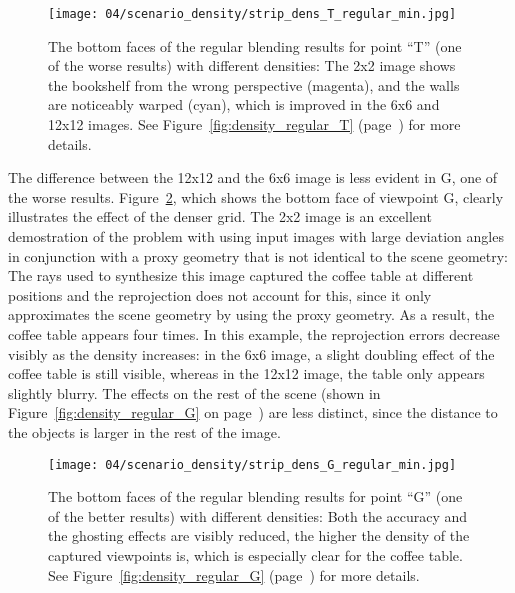 \begin{figure}[p]
		\centering
    \texttt{[image: 04/scenario\_density/strip\_dens\_T\_regular\_min.jpg]}
    \caption[Bottom faces of regular blending results for viewpoint ``T'' with different densities]{The bottom faces of the regular blending results for point ``T'' (one of the worse results) with different densities: The 2x2 image shows the bookshelf from the wrong perspective (magenta), and the walls are noticeably warped (cyan), which is improved in the 6x6 and 12x12 images. See Figure~\ref{fig:density_regular_T} (page~\pageref{fig:density_regular_T}) for more details.}
		\label{fig:density_regular_T_min}
\end{figure}

The difference between the 12x12 and the 6x6 image is less evident in G, one of the worse results. Figure~\ref{fig:density_regular_G_min}, which shows the bottom face of viewpoint G, clearly illustrates the effect of the denser grid. The 2x2 image is an excellent demostration of the problem with using input images with large deviation angles in conjunction with a proxy geometry that is not identical to the scene geometry: The rays used to synthesize this image captured the coffee table at different positions and the reprojection does not account for this, since it only approximates the scene geometry by using the proxy geometry. As a result, the coffee table appears four times. In this example, the reprojection errors decrease visibly as the density increases: in the 6x6 image, a slight doubling effect of the coffee table is still visible, whereas in the 12x12 image, the table only appears slightly blurry. The effects on the rest of the scene (shown in Figure~\ref{fig:density_regular_G} on page~\pageref{fig:density_regular_G}) are less distinct, since the distance to the objects is larger in the rest of the image.

\begin{figure}[p]
		\centering
    \texttt{[image: 04/scenario\_density/strip\_dens\_G\_regular\_min.jpg]}
    \caption[Bottom faces of regular blending results for viewpoint ``G'' with different densities] {The bottom faces of the regular blending results for point ``G'' (one of the better results) with different densities: Both the accuracy and the ghosting effects are visibly reduced, the higher the density of the captured viewpoints is, which is especially clear for the coffee table. See Figure~\ref{fig:density_regular_G} (page~\pageref{fig:density_regular_G}) for more details.}
		\label{fig:density_regular_G_min}
\end{figure}

